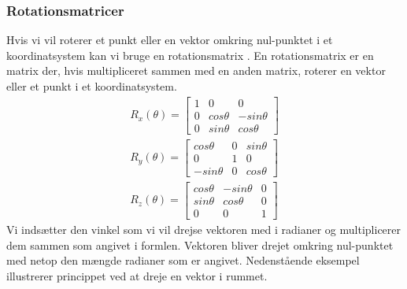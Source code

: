 \subsubsection{Rotationsmatricer}
Hvis vi vil roterer et punkt eller en vektor omkring nul-punktet i et koordinatsystem kan vi bruge en rotationsmatrix \cite{perspective_projection}.
En rotationsmatrix er en matrix der, hvis multipliceret sammen med en anden matrix, roterer en vektor eller et punkt i et koordinatsystem.
\begin{align}\label{eu_eqn}
  R_x(\theta) = 
  \begin{bmatrix}
    1 & 0 & 0\\ 
    0 & cos \theta & - sin \theta\\ 
    0 & sin \theta & cos \theta
  \end{bmatrix}\\
    R_y(\theta) =
  \begin{bmatrix}
    cos \theta  & 0 & sin \theta\\ 
    0           & 1 & 0\\ 
    -sin \theta & 0 & cos \theta
  \end{bmatrix}\\
    R_z(\theta) = 
  \begin{bmatrix}
    cos \theta & - sin \theta & 0\\ 
    sin \theta & cos \theta & 0\\
    0 & 0 & 1
  \end{bmatrix}
\end{align}
Vi indsætter den vinkel som vi vil drejse vektoren med i radianer og multiplicerer dem sammen som angivet i formlen. Vektoren bliver drejet omkring nul-punktet med netop den mængde radianer som er angivet.
Nedenstående eksempel illustrerer princippet ved at dreje en vektor i rummet.

